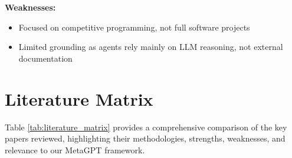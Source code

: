 \textbf{Weaknesses:}
\begin{itemize}
    \item Focused on competitive programming, not full software projects
    \item Limited grounding as agents rely mainly on LLM reasoning, not external documentation
\end{itemize}

\section{Literature Matrix}

Table \ref{tab:literature_matrix} provides a comprehensive comparison of the key papers reviewed, highlighting their methodologies, strengths, weaknesses, and relevance to our MetaGPT framework.


